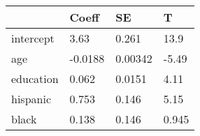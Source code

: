 \begin{tabular}{llll}
\hline 
& Coeff & SE & T \\ 
\hline 
intercept & 3.63 & 0.261 & 13.9 \\ 
age & -0.0188 & 0.00342 & -5.49 \\ 
education & 0.062 & 0.0151 & 4.11 \\ 
hispanic & 0.753 & 0.146 & 5.15 \\ 
black & 0.138 & 0.146 & 0.945 \\ 
\hline 
\end{tabular}